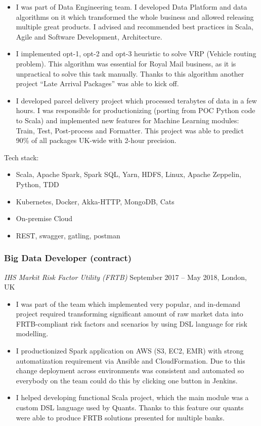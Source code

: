 \documentclass[]{rss}
\providecommand{\tightlist}{%
  \setlength{\itemsep}{0pt}\setlength{\parskip}{0pt}}
\begin{document}
\begin{resume}
\begin{itemize}
\item
  I was part of Data Engineering team. I developed Data Platform and
  data algorithms on it which transformed the whole business and allowed
  releasing multiple great products. I advised and recommended best
  practices in Scala, Agile and Software Development, Architecture.
\item
  I implemented opt-1, opt-2 and opt-3 heuristic to solve VRP (Vehicle
  routing problem). This algorithm was essential for Royal Mail
  business, as it is unpractical to solve this task manually. Thanks to
  this algorithm another project ``Late Arrival Packages'' was able to
  kick off.
\item
  I developed parcel delivery project which processed terabytes of data
  in a few hours. I was responsible for productionizing (porting from
  POC Python code to Scala) and implemented new features for Machine
  Learning modules: Train, Test, Post-process and Formatter. This
  project was able to predict 90\% of all packages UK-wide with 2-hour
  precision.
\end{itemize}

Tech stack:

\begin{itemize}
\tightlist
\item
  Scala, Apache Spark, Spark SQL, Yarn, HDFS, Linux, Apache Zeppelin,
  Python, TDD
\item
  Kubernetes, Docker, Akka-HTTP, MongoDB, Cats
\item
  On-premise Cloud
\item
  REST, swagger, gatling, postman
\end{itemize}

\subsubsection{Big Data Developer
(contract)}\label{big-data-developer-contract}

\emph{IHS Markit \textbar{} Risk Factor Utility (FRTB)} September 2017
-- May 2018, London, UK

\begin{itemize}
\item
  I was part of the team which implemented very popular, and in-demand
  project required transforming significant amount of raw market data
  into FRTB-compliant risk factors and scenarios by using DSL language
  for risk modelling.
\item
  I productionized Spark application on AWS (S3, EC2, EMR) with strong
  automatization requirement via Ansible and CloudFormation. Due to this
  change deployment across environments was consistent and automated so
  everybody on the team could do this by clicking one button in Jenkins.
\item
  I helped developing functional Scala project, which the main module
  was a custom DSL language used by Quants. Thanks to this feature our
  quants were able to produce FRTB solutions presented for multiple
  banks.
\end{itemize}


\end{resume}
\end{document}
